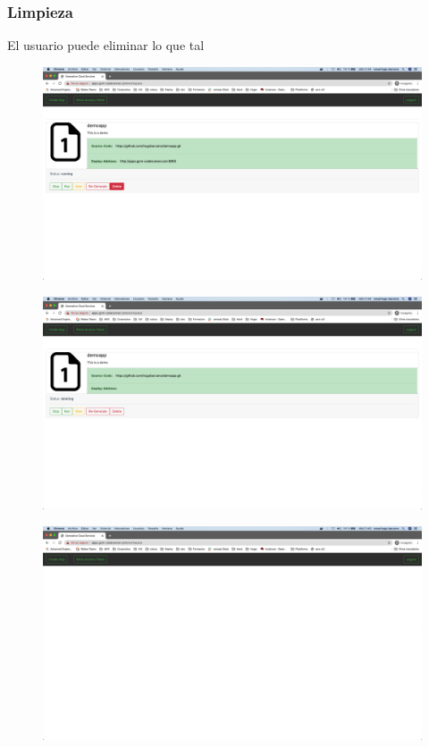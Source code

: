 \documentclass[a4paper,11pt]{book}
\begin{document}
\subsubsection{Limpieza}

El usuario puede eliminar lo que tal


   \begin{figure}[H]
\centering
\includegraphics[scale=0.2]{imagenes/casouso/5_1.png}
\caption{   }
\end{figure}


   \begin{figure}[H]
\centering
\includegraphics[scale=0.2]{imagenes/casouso/5_2.png}
\caption{   }
\end{figure}

   \begin{figure}[H]
\centering
\includegraphics[scale=0.2]{imagenes/casouso/5_3.png}
\caption{   }
\end{figure}
\end{document}
